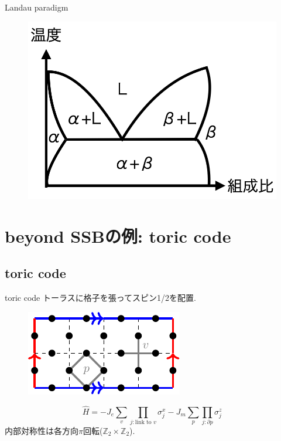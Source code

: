 \documentclass[dvipdfm]{beamer}
\begin{document}
\begin{frame}{Landau paradigm}
\begin{figure}
\begin{minipage}{0.45\linewidth}
        \end{minipage}
        \begin{minipage}{0.45\linewidth}
            \centering
            \includegraphics[width=0.8\linewidth]{solid2.png}
        \end{minipage}
    \end{figure}
\end{frame}


\section{beyond SSBの例: toric code}

\subsection{toric code}

\begin{frame}{toric code}
    トーラスに格子を張ってスピン1/2を配置.
    \begin{figure}
        \centering
        \includegraphics[width=0.4\linewidth]{./toric.pdf}
    \end{figure}
    \begin{equation*}
        \hat{H}
        =
        -J_e\sum_v\prod_{j: \text{link to }v}\sigma_j^x
        -J_m\sum_p\prod_{j: \partial p}\sigma_j^z
    \end{equation*}
    内部対称性は各方向$\pi$回転($\mathbb{Z}_2\times\mathbb{Z}_2$).
\end{frame}
\end{document}
